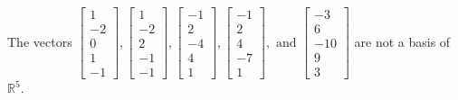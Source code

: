 \begin{exercise}
\begin{exerciseStatement}
  \end{exerciseStatement}
  \begin{exerciseAnswer}
   The vectors \(\left[\begin{array}{r}
1 \\
-2 \\
0 \\
1 \\
-1
\end{array}\right] , \left[\begin{array}{r}
1 \\
-2 \\
2 \\
-1 \\
-1
\end{array}\right] , \left[\begin{array}{r}
-1 \\
2 \\
-4 \\
4 \\
1
\end{array}\right] , \left[\begin{array}{r}
-1 \\
2 \\
4 \\
-7 \\
1
\end{array}\right] , \text{ and } \left[\begin{array}{r}
-3 \\
6 \\
-10 \\
9 \\
3
\end{array}\right]\) 
  	 are not  a basis of \(\mathbb{R}^5\).
  


  \end{exerciseAnswer}
\end{exercise}